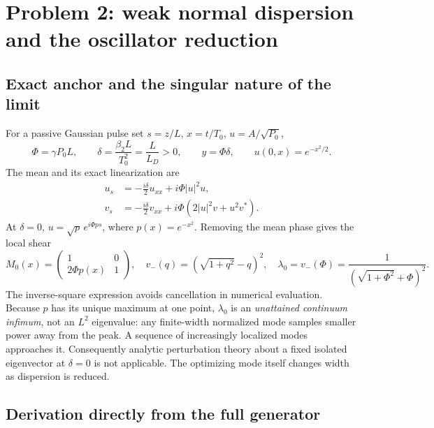 \documentclass[11pt,a4paper]{article}
\newcommand{\lzero}{\lambda_0}
\begin{document}
\section{Problem 2: weak normal dispersion and the oscillator reduction}

\subsection{Exact anchor and the singular nature of the limit}

For a passive Gaussian pulse set $s=z/L$, $x=t/T_0$, $u=A/\sqrt{P_0}$,
\begin{equation}
\Phi=\gamma P_0L,\qquad \delta=\frac{\beta_2L}{T_0^2}=\frac L{L_D}>0,\qquad y=\Phi\delta,
\qquad u(0,x)=e^{-x^2/2}.
\end{equation}
The mean and its exact linearization are
\begin{align}\label{eq:weakmean}
u_s&=-\frac{i\delta}{2}u_{xx}+i\Phi|u|^2u,\\
v_s&=-\frac{i\delta}{2}v_{xx}+i\Phi(2|u|^2v+u^2v^*).
\end{align}
At $\delta=0$, $u=\sqrt p\,e^{i\Phi p s}$, where $p(x)=e^{-x^2}$. Removing the mean phase gives the local shear
\begin{equation}
M_0(x)=\begin{pmatrix}1&0\\2\Phi p(x)&1\end{pmatrix},\quad
v_-(q)=(\sqrt{1+q^2}-q)^2,\quad
\lzero=v_-(\Phi)=\frac1{(\sqrt{1+\Phi^2}+\Phi)^2}.
\end{equation}
The inverse-square expression avoids cancellation in numerical evaluation. Because $p$ has its unique maximum at one point, $\lzero$ is an \emph{unattained continuum infimum}, not an $L^2$ eigenvalue: any finite-width normalized mode samples smaller power away from the peak. A sequence of increasingly localized modes approaches it. Consequently analytic perturbation theory about a fixed isolated eigenvector at $\delta=0$ is not applicable. The optimizing mode itself changes width as dispersion is reduced.

\subsection{Derivation directly from the full generator}
\end{document}
